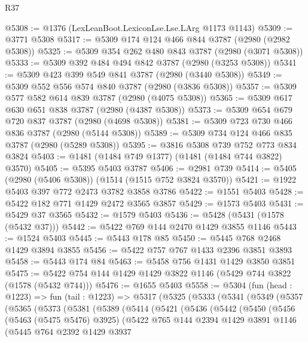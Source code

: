 \begin{lexlean}{R37}
\begin{coremodule}
@5308 := @1376 (LexLeanBoot.LexiconLse.Lse.LArg @1173 @1143)
@5309 := @3771 @5308
@5317 := @5309 @174 @124 @466 @844 @3787 (@2980 (@2982 @5308))
@5325 := @5309 @354 @262 @480 @843 @3787 (@2980 (@3071 @5308))
@5333 := @5309 @392 @484 @494 @842 @3787 (@2980 (@3253 @5308))
@5341 := @5309 @423 @399 @549 @841 @3787 (@2980 (@3440 @5308))
@5349 := @5309 @552 @556 @574 @840 @3787 (@2980 (@3836 @5308))
@5357 := @5309 @577 @582 @614 @839 @3787 (@2980 (@4075 @5308))
@5365 := @5309 @617 @630 @651 @838 @3787 (@2980 (@4387 @5308))
@5373 := @5309 @654 @679 @720 @837 @3787 (@2980 (@4698 @5308))
@5381 := @5309 @723 @730 @466 @836 @3787 (@2980 (@5144 @5308))
@5389 := @5309 @734 @124 @466 @835 @3787 (@2980 (@5289 @5308))
@5395 := @3816 @5308 @739 @752 @773 @834 @3824
@5403 := @1481 (@1484 @749 @1377) (@1481 (@1484 @744 @3822) @3570)
@5405 := @5395 @5403 @3787
@5406 := @2981 @739
@5414 := @5405 (@2980 (@5406 @5308)) (@1514 (@1515 @752 @3824 @3570))
@5421 := @1922 @5403 @397 @772 @2473 @3782 @3858 @3786
@5422 := @1551 @5403
@5428 := @5422 @182 @771 @1429 @2472 @3565 @3857
@5429 := @1573 @5403
@5431 := @5429 @37 @3565
@5432 := @1579 @5403
@5436 := @5428 (@5431 (@1578 (@5432 @37)))
@5442 := @5422 @769 @144 @2470 @1429 @3855 @1146
@5443 := @1524 @5403
@5445 := @5443 @178 @85
@5450 := @5445 @768 @2468 @1429 @3894 @3855
@5456 := @5422 @757 @767 @1433 @2396 @3851 @3893
@5458 := @5443 @174 @84
@5463 := @5458 @756 @1431 @1429 @3850 @3851
@5475 := @5422 @754 @144 @1429 @1429 @3822 @1146 (@5429 @744 @3822 (@1578 (@5432 @744)))
@5476 := @1655 @5403
@5558 := @5304
    (fun (head : @1223) =>
    fun (tail : @1223) =>
    @5317
      (@5325
        (@5333
          (@5341
            (@5349
              (@5357
                (@5365
                  (@5373
                    (@5381
                      (@5389
                        (@5414
                          (@5421
                            (@5436
                              (@5442
                                (@5450
                                  (@5456
                                    (@5463 (@5475 @5476) @3925)
                                    (@5422
                                      @765
                                      @144
                                      @2394
                                      @1429
                                      @3891
                                      @1146
                                      (@5445
                                        @764
                                        @2392
                                        @1429
                                        @3937

\end{coremodule}
\end{lexlean}

